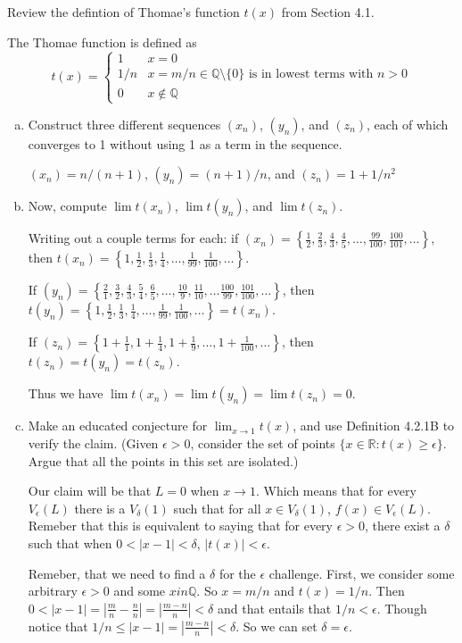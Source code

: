Review the defintion of Thomae's function $t(x)$ from Section 4.1.

The Thomae function is defined as
$$
t(x) =
\begin{cases} 
    1   & x = 0 \\
    1/n & x=m/n \in \mathbb{Q} \setminus \{0\} \text{ is in lowest terms with } n>0 \\
    0   & x \not\in \mathbb{Q} 
\end{cases}
$$

\begin{enumerate}[(a)]
\item Construct three different sequences $(x_n)$, $(y_n)$, and $(z_n)$, each of which converges to 1 without using 1 as a term in
the sequence.

$(x_n) = n/(n+1)$, $(y_n) = (n+1)/n$, and $(z_n) = 1 + 1/n^2$

\item Now, compute $\lim t(x_n)$, $\lim t(y_n)$, and $\lim t(z_n)$.

Writing out a couple terms for each: if
$(x_n) = \left\{ \frac{1}{2}, \frac{2}{3}, \frac{4}{3}, \frac{4}{5}, \ldots , \frac{99}{100}, \frac{100}{101}, \ldots \right\}$, then
$t(x_n) = \left\{ 1, \frac{1}{2}, \frac{1}{3}, \frac{1}{4}, \ldots , \frac{1}{99}, \frac{1}{100}, \ldots \right\}$.

If $(y_n) = \left\{\frac{2}{1}, \frac{3}{2}, \frac{4}{3}, \frac{5}{4}, \frac{6}{5}, \ldots , \frac{10}{9}, \frac{11}{10}, \ldots \frac{100}{99}, \frac{101}{100}, \ldots \right\}$, then
$t(y_n) = \left\{ 1, \frac{1}{2}, \frac{1}{3}, \frac{1}{4}, \ldots , \frac{1}{99}, \frac{1}{100}, \ldots \right\} = t(x_n)$.

If $(z_n) = \left\{1+\frac{1}{1}, 1+\frac{1}{4}, 1+\frac{1}{9}, \ldots , 1+\frac{1}{100}, \ldots \right\}$, then
$t(z_n) = t(y_n) = t(z_n)$.

Thus we have $\lim t(x_n) = \lim t(y_n) = \lim t(z_n) = 0$.

\item Make an educated conjecture for $\lim_{x\rightarrow 1} t(x)$, and use Definition 4.2.1B to verify the claim.
(Given $\epsilon > 0$, consider the set of points $\{ x\in\mathbb{R} : t(x) \geq \epsilon \}$.
Argue that all the points in this set are isolated.)

Our claim will be that $L=0$ when $x\rightarrow 1$.
Which means that for every $V_{\epsilon} (L)$ there is a $V_{\delta} (1)$ such that for all $x \in V_{\delta} (1)$, $f(x) \in V_{\epsilon} (L)$.
Remeber that this is equivalent to saying that for every $\epsilon >0$, there exist a $\delta$ such that when $0 < |x-1| < \delta$,
$|t(x)| < \epsilon$.

Remeber, that we need to find a $\delta$ for the $\epsilon$ challenge.
First, we consider some arbitrary $\epsilon > 0$ and some $x in \mathbb{Q}$.
So $x = m/n$ and $t(x) = 1/n$.
Then $0 < |x-1| = |\frac{m}{n} - \frac{n}{n}| = |\frac{m-n}{n}| < \delta$ and that entails that $1/n < \epsilon$.
Though notice that $1/n \leq |x-1| = |\frac{m-n}{n}| < \delta$.
So we can set $\delta = \epsilon$.

\end{enumerate}



